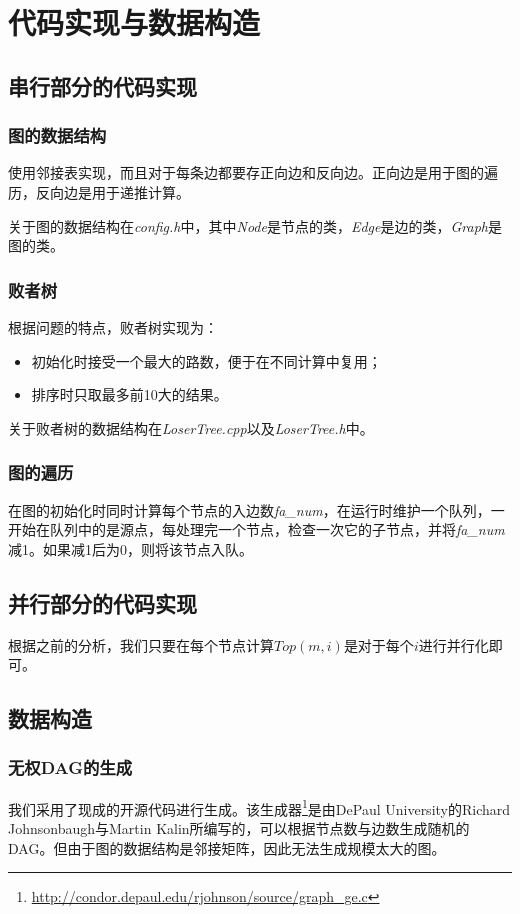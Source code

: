 \documentclass{article}
\begin{document}
	\section{代码实现与数据构造}
	\subsection{串行部分的代码实现}
	\subsubsection{图的数据结构}
	使用邻接表实现，而且对于每条边都要存正向边和反向边。正向边是用于图的遍历，反向边是用于递推计算。
	
	关于图的数据结构在\emph{config.h}中，其中\emph{Node}是节点的类，\emph{Edge}是边的类，\emph{Graph}是图的类。
	
	\subsubsection{败者树}
	根据问题的特点，败者树实现为：
	\begin{itemize}
		\item 初始化时接受一个最大的路数，便于在不同计算中复用；
		\item 排序时只取最多前10大的结果。
	\end{itemize}
	
	关于败者树的数据结构在\emph{LoserTree.cpp}以及\emph{LoserTree.h}中。
	
	\subsubsection{图的遍历}
	在图的初始化时同时计算每个节点的入边数\emph{fa\_num}，在运行时维护一个队列，一开始在队列中的是源点，每处理完一个节点，检查一次它的子节点，并将\emph{fa\_num}减1。如果减1后为0，则将该节点入队。
	
	\subsection{并行部分的代码实现}
	根据之前的分析，我们只要在每个节点计算$Top(m,i)$是对于每个$i$进行并行化即可。
	
	\subsection{数据构造}
	\subsubsection{无权DAG的生成}
	我们采用了现成的开源代码进行生成。该生成器\footnote{\url{http://condor.depaul.edu/rjohnson/source/graph_ge.c}}是由DePaul University的Richard Johnsonbaugh与Martin Kalin所编写的，可以根据节点数与边数生成随机的DAG。但由于图的数据结构是邻接矩阵，因此无法生成规模太大的图。
	
\end{document}
